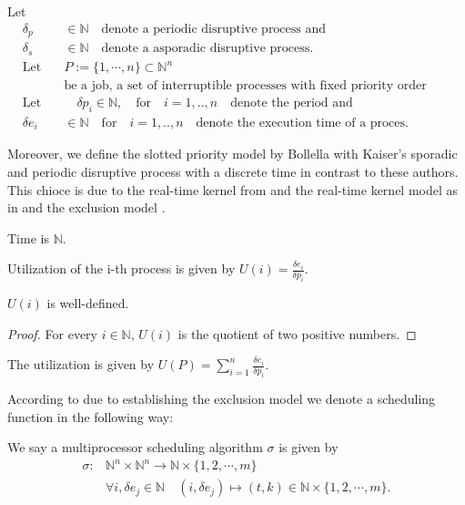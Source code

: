 \begin{definition}
	Let      
	\begin{align} 
	& \delta_p &\in \mathbb{N} \quad \text{denote a periodic disruptive process and}\\
 	&\delta_s &\in \mathbb{N} \quad \text{denote a asporadic disruptive process.}\\
 &\text{Let} \quad & P := \{1, \cdots, n \} \subset \mathbb{N}^n \\
 &\quad & \text{be a job, a set of interruptible processes with fixed priority order ascading.} \\
 	&\text{Let} & \quad  \delta p_i \in \mathbb{N}, \quad \text{for} \quad i = 1,..,n \quad  \text{denote the period and}  \\
 	&\delta e_i & \in \mathbb{N} \quad \text{for} \quad  i = 1,..,n \quad  \text{denote the execution time of a proces}.  
 	\end{align}   
\end{definition}

Moreover, we define the slotted priority model by Bollella with Kaiser's sporadic and periodic disruptive process with a discrete time in contrast to these authors.
This chioce is due to the real-time kernel from \cite{PROSA_schedubility_analysis} and the real-time kernel model as in \cite[chp. 5.3]{B97} and the exclusion model \cite[p.12]{B97}.

\begin{definition}
	Time is $\mathbb{N}$.
\end{definition}


\begin{definition}
	Utilization of the i-th process is given by $U(i) = \frac{\delta e_i}{\delta p_i}$.
\end{definition}
\begin{lemma}
$U(i)$ is well-defined.
\end{lemma}
\begin{proof}
For every $i\in \mathbb{N}$, $U(i)$ is the quotient of two positive numbers.
\end{proof}

\begin{definition}
The utilization is given by $U(P)= \sum_{i=1}^n \frac{\delta e_i}{\delta p_i}$.
\end{definition}

According to \cite{B97} due to establishing the exclusion model we denote  a scheduling function in the following way:

\begin{definition}
We say a multiprocessor scheduling algorithm $\sigma$ is given by 
	\begin{align} 
	\sigma: &\mathbb{N}^n \times \mathbb{N}^n \longrightarrow  \mathbb{N} \times \{1,2,\cdots, m\} \\
	&\forall i, \delta e_j \in  \mathbb{N} \quad (i ,\delta e_j)  \mapsto (t,k) \in \mathbb{N}\times \{1,2,\cdots,m\}. 
	\end{align}
\end{definition}


